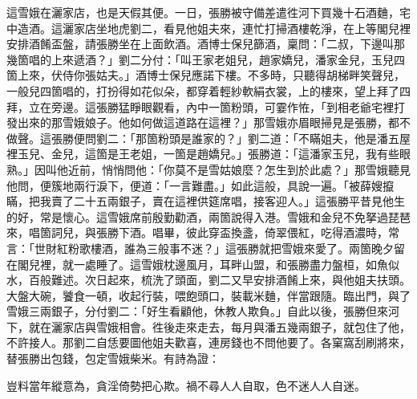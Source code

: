 這雪娥在灑家店，也是天假其便。一日，張勝被守備差遣徃河下買幾十石酒麯，宅中造酒。這灑家店坐地虎劉二，看見他姐夫來，連忙打掃酒樓乾淨，在上等閣兒裡安排酒餚盃盤，請張勝坐在上面飲酒。酒博士保兒篩酒，稟問：「二叔，下邊叫那幾箇唱的上來遞酒？」劉二分付：「叫王家老姐兒，趙家嬌兒，潘家金兒，玉兒四箇上來，伏侍你張姑夫。」酒博士保兒應諾下樓。不多時，只聽得胡梯畔笑聲兒，一般兒四箇唱的，打扮得如花似朵，都穿着輕紗軟絹衣裳，上的樓來，望上拜了四拜，立在旁邊。這張勝猛睜眼觀看，內中一箇粉頭，可霎作恠，「到相老爺宅裡打發出來的那雪娥娘子。他如何做這道路在這裡？」那雪娥亦眉眼掃見是張勝，都不做聲。這張勝便問劉二：「那箇粉頭是誰家的？」劉二道：「不瞞姐夫，他是潘五屋裡玉兒、金兒，這箇是王老姐，一箇是趙嬌兒。」張勝道：「這潘家玉兒，我有些眼熟。」因叫他近前，悄悄問他：「你莫不是雪姑娘麼？怎生到於此處？」那雪娥聽見他問，便簇地兩行淚下，便道：「一言難盡。」如此這般，具說一遍。「被薛嫂攛瞞，把我賣了二十五兩銀子，賣在這裡供筵席唱，接客迎人。」這張勝平昔見他生的好，常是懷心。這雪娥席前殷勤勸酒，兩箇說得入港。雪娥和金兒不免拏過琵琶來，唱箇詞兒，與張勝下酒。唱畢，彼此穿盃換盞，倚翠偎紅，吃得酒濃時，常言：「世財紅粉歌樓酒，誰為三般事不迷？」這張勝就把雪娥來愛了。兩箇晚夕留在閣兒裡，就一處睡了。這雪娥枕邊風月，耳畔山盟，和張勝盡力盤桓，如魚似水，百般難述。次日起來，梳洗了頭面，劉二又早安排酒餚上來，與他姐夫扶頭。大盤大碗，饕食一頓，收起行裝，喂飽頭口，裝載米麯，伴當跟隨。臨出門，與了雪娥三兩銀子，分付劉二：「好生看顧他，休教人欺負。」自此以後，張勝但來河下，就在灑家店與雪娥相會。徃後走來走去，每月與潘五幾兩銀子，就包住了他，不許接人。那劉二自恁要圖他姐夫歡喜，連房錢也不問他要了。各窠窩刮刷將來，替張勝出包錢，包定雪娥柴米。有詩為證：

豈料當年縱意為，貪淫倚勢把心欺。禍不尋人人自取，色不迷人人自迷。

